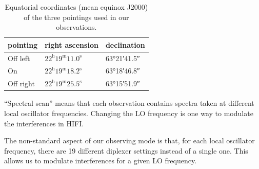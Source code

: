 \begin{table}
%
    \centering
    \begin{tabular}{lll}
        \toprule
        pointing  & right ascension & declination \\
        \midrule
        Off left  & $22^\text{h}19^\text{m}11.0^\text{s}$ & \ang{63;21;41.5}\\
        On        & $22^\text{h}19^\text{m}18.2^\text{s}$ & \ang{63;18;46.8}\\
        Off right & $22^\text{h}19^\text{m}25.5^\text{s}$ & \ang{63;15;51.9}\\
        \bottomrule
    \end{tabular}
    \caption{Equatorial coordinates (mean equinox J2000) of the three pointings used in our observations.}
    \label{tab:on_off_positions}
\end{table}

``Spectral scan'' means that each observation contains spectra taken at different local oscillator frequencies.
Changing the LO frequency is one way to modulate the interferences in HIFI.

The non-standard aspect of our observing mode is that, for each local oscillator frequency, there are 19 different diplexer settings instead of a single one.
This allows us to modulate interferences for a given LO frequency.

